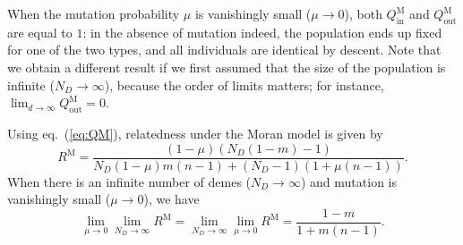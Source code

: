 \documentclass[11pt, letterpaper]{article}
\renewcommand{\eqref}[1]{\textup{{\normalfont eq.~(\ref{#1}}\normalfont)}}
\newcommand{\Moran}{\textrm{M}}
\newcommand{\inn}{\textrm{in}}
\newcommand{\out}{\textrm{out}}
\newcommand{\Qin}{Q_{\inn}}
\newcommand{\Qout}{Q_{\out}}
\newcommand{\ndemes}{N_D}
\begin{document}
When the mutation probability $\mu$ is vanishingly small ($\mu \to 0$), both $\Qin^{\Moran}$ and $\Qout^{\Moran}$ are equal to $1$: in the absence of mutation indeed, the population ends up fixed for one of the two types, and all individuals are identical by descent. Note that we obtain a different result if we first assumed that the size of the population is infinite ($\ndemes \to \infty$), because the order of limits matters; %
for instance, $\lim_{d\to \infty} \Qout^{\Moran}=0$. 

Using \eqref{eq:QM}, relatedness under the Moran model is given by 
%
\begin{equation}\label{eq:app:RM}
R^{\Moran} = \frac{(1-\mu ) (\ndemes (1-m)-1)}{\ndemes (1-\mu ) m (n-1)+(\ndemes-1) ( 1 + \mu (n-1))}.
\end{equation}
When there is an infinite number of demes ($\ndemes \to \infty$) and mutation is vanishingly small ($\mu \to 0$), we have
\begin{equation}\label{eq:app:RMlim}
\lim_{\mu \to 0} \lim_{\ndemes \to \infty} R^{\Moran} =  \lim_{\ndemes \to \infty} \lim_{\mu \to 0} R^{\Moran} = \frac{1 - m}{1 + m (n - 1)}.
\end{equation}
\end{document}
